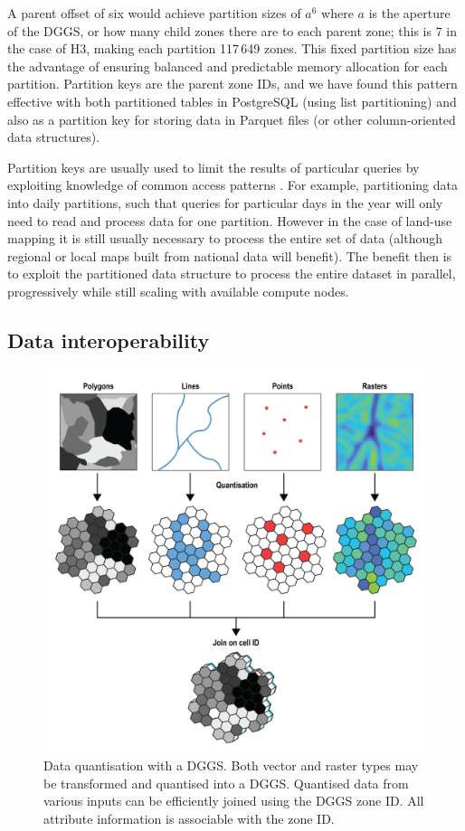 \documentclass[]{interact}
\theoremstyle{plain}%
\theoremstyle{definition}
\theoremstyle{remark}
\begin{document}
A parent offset of six would achieve partition sizes of $a^{6}$ where $a$ is the aperture of the \ac{DGGS}, or how many child zones there are to each parent zone; this is 7 in the case of H3, making each partition 117\,649 zones. This fixed partition size has the advantage of ensuring balanced and predictable memory allocation for each partition. Partition keys are the parent zone IDs, and we have found this pattern effective with both partitioned tables in PostgreSQL (using list partitioning) and also as a partition key for storing data in Parquet files (or other column-oriented data structures).

Partition keys are usually used to limit the results of particular queries by exploiting knowledge of common access patterns \citep{abadi2008column}. For example, partitioning data into daily partitions, such that queries for particular days in the year will only need to read and process data for one partition. However in the case of land-use mapping it is still usually necessary to process the entire set of data (although regional or local maps built from national data will benefit). The benefit then is to exploit the partitioned data structure to process the entire dataset in parallel, progressively while still scaling with available compute nodes.

\subsection{Data interoperability}

\begin{figure}[t]
    \centering
    \includegraphics[width=0.65\linewidth]{images/DGGS_lu-01.png}
    \caption{Data quantisation with a \ac{DGGS}. Both vector and raster types may be transformed and quantised into a \ac{DGGS}. Quantised data from various inputs can be efficiently joined using the \ac{DGGS} zone ID. All attribute information is associable with the zone ID.}
    \label{fig:Interoperable}
\end{figure}
\end{document}
